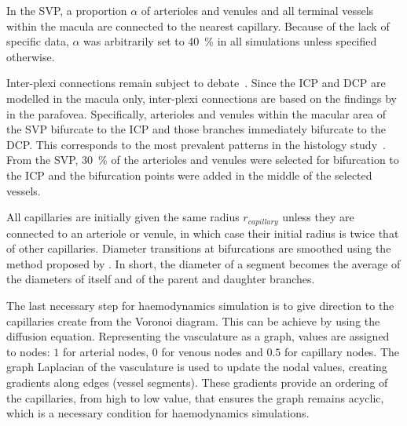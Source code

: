 \documentclass[11pt,]{article}
\begin{document}
In the SVP, a proportion $\alpha$ of arterioles and venules and all terminal vessels within the macula are connected to the nearest capillary. Because of the lack of specific data, $\alpha$ was arbitrarily set to \SI{40}{\percent} in all simulations unless specified otherwise.

Inter-plexi connections remain subject to debate~\cite{An2020,Chiaravalli2022,Campbell2017}.
Since the ICP and DCP are modelled in the macula only, inter-plexi connections are based on the findings by \citet{An2020} in the parafovea.
Specifically, arterioles and venules within the macular area of the SVP bifurcate to the ICP and those branches immediately bifurcate to the DCP.
This corresponds to the most prevalent patterns in the histology study~\cite{An2020}.
From the SVP, \SI{30}{\percent} of the arterioles and venules were selected for bifurcation to the ICP and the bifurcation points were added in the middle of the selected vessels.

All capillaries are initially given the same radius $r_{capillary}$ unless they are connected to an arteriole or venule, in which case their initial radius is twice that of other capillaries.
Diameter transitions at bifurcations are smoothed using the method proposed by \citet{Linninger2013}.
In short, the diameter of a segment becomes the average of the diameters of itself and of the parent and daughter branches.

The last necessary step for haemodynamics simulation is to give direction to the capillaries create from the Voronoi diagram.
This can be achieve by using the diffusion equation.
Representing the vasculature as a graph, values are assigned to nodes: $1$ for arterial nodes, $0$ for venous nodes and $0.5$ for capillary nodes.
The graph Laplacian of the vasculature is used to update the nodal values, creating gradients along edges (vessel segments).
These gradients provide an ordering of the capillaries, from high to low value, that ensures the graph remains acyclic, which is a necessary condition for haemodynamics simulations.
\end{document}
